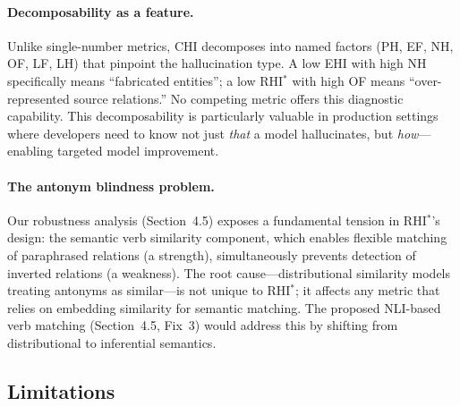 \documentclass[11pt]{article}
\begin{document}
\paragraph{Decomposability as a feature.} Unlike single-number metrics, CHI decomposes into named factors (PH, EF, NH, OF, LF, LH) that pinpoint the hallucination type. A low EHI with high NH specifically means ``fabricated entities''; a low RHI$^*$ with high OF means ``over-represented source relations.'' No competing metric offers this diagnostic capability. This decomposability is particularly valuable in production settings where developers need to know not just \emph{that} a model hallucinates, but \emph{how}---enabling targeted model improvement.

\paragraph{The antonym blindness problem.} Our robustness analysis (Section~4.5) exposes a fundamental tension in RHI$^*$'s design: the semantic verb similarity component, which enables flexible matching of paraphrased relations (a strength), simultaneously prevents detection of inverted relations (a weakness). The root cause---distributional similarity models treating antonyms as similar---is not unique to RHI$^*$; it affects any metric that relies on embedding similarity for semantic matching. The proposed NLI-based verb matching (Section~4.5, Fix~3) would address this by shifting from distributional to inferential semantics.

\subsection{Limitations}
\end{document}
